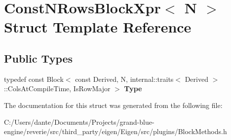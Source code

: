 \hypertarget{struct_const_n_rows_block_xpr}{}\section{Const\+N\+Rows\+Block\+Xpr$<$ N $>$ Struct Template Reference}
\label{struct_const_n_rows_block_xpr}
\subsection*{Public Types}
\begin{DoxyCompactItemize}
\item 
\mbox{\label{struct_const_n_rows_block_xpr_ae63ae688b42419e3dd3167c2f06864c5}} 
typedef const Block$<$ const Derived, N, internal\+::traits$<$ Derived $>$\+::Cols\+At\+Compile\+Time, Is\+Row\+Major $>$ {\bfseries Type}
\end{DoxyCompactItemize}


The documentation for this struct was generated from the following file\+:\begin{DoxyCompactItemize}
\item 
C\+:/\+Users/dante/\+Documents/\+Projects/grand-\/blue-\/engine/reverie/src/third\+\_\+party/eigen/\+Eigen/src/plugins/Block\+Methods.\+h\end{DoxyCompactItemize}
